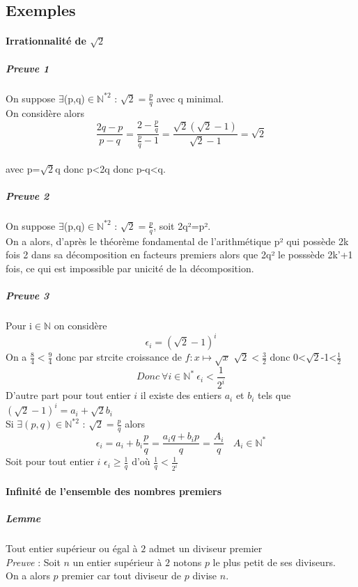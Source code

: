 \subsection{Exemples}

\paragraph{Irrationnalité de $\sqrt{2}$}

\subparagraph{Preuve 1}

On suppose $\exists$(p,q)$\in\mathbb{N} ^{*2}$ : $\sqrt{2} =\frac{p}{q}$ avec q minimal.
\\On considère alors \[\frac{2q-p}{p-q} =\frac{2-\frac{p}{q}}{\frac{p}{q} -1} =\frac{\sqrt{2} (\sqrt{2} -1)}{\sqrt{2} -1} =\sqrt{2}\]
\\avec p=$\sqrt{2}$q donc p<2q donc p-q<q.

\subparagraph{Preuve 2}

On suppose $\exists$(p,q)$\in\mathbb{N} ^{*2}$ : $\sqrt{2} =\frac{p}{q}$, soit 2q²=p².
\\On a alors, d'après le théorème fondamental de l'arithmétique p² qui possède 2k fois 2 dans sa décomposition en facteurs premiers alors que 2q² le posssède 2k'+1 fois, ce qui est impossible par unicité de la décomposition.

\subparagraph{Preuve 3}

Pour i$\in\mathbb{N}$ on considère \[\epsilon _i=(\sqrt{2} -1)^i\]
On a $\frac{8}{4} <\frac{9}{4}$ donc par strcite croissance de $f:x\mapsto\sqrt{x}$ $\sqrt{2} <\frac{3}{2}$ donc 0<$\sqrt{2}$-1<$\frac{1}{2}$
\[Donc~\forall i\in\mathbb{N} ^*~\epsilon _i<\frac{1}{2^i}\]
D'autre part pour tout entier $i$ il existe des entiers $a_i$ et $b_i$ tels que 
\\$(\sqrt{2} -1)^i=a_i+\sqrt{2} b_i$
\\Si $\exists (p,q)\in\mathbb{N} ^{*2}$ : $\sqrt{2} =\frac{p}{q}$ alors \[\epsilon _i=a_i+b_i\frac{p}{q} =\frac{a_iq+b_ip}{q} =\frac{A_i}{q} ~~~~A_i\in\mathbb{N} ^*\]
Soit pour tout entier $i$ $\epsilon _i\geq\frac{1}{q}$ d'où $\frac{1}{q} <\frac{1}{2^i}$

\paragraph{Infinité de l'ensemble des nombres premiers}

\subparagraph{Lemme}

Tout entier supérieur ou égal à $2$ admet un diviseur premier
\\\textsl{Preuve} : Soit $n$ un entier supérieur à $2$ notons $p$ le plus petit de ses diviseurs.
\\On a alors $p$ premier car tout diviseur de $p$ divise $n$.

